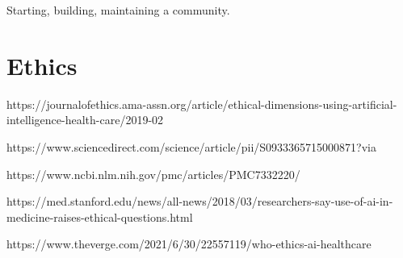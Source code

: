 \documentclass[../main.tex]{subfiles}
\begin{document}
        Starting, building, maintaining a community.

    \section{Ethics}
    
    https://journalofethics.ama-assn.org/article/ethical-dimensions-using-artificial-intelligence-health-care/2019-02
    
    https://www.sciencedirect.com/science/article/pii/S0933365715000871?via%
    
    https://www.ncbi.nlm.nih.gov/pmc/articles/PMC7332220/
    
    https://med.stanford.edu/news/all-news/2018/03/researchers-say-use-of-ai-in-medicine-raises-ethical-questions.html

    https://www.theverge.com/2021/6/30/22557119/who-ethics-ai-healthcare
    
    
\end{document}
